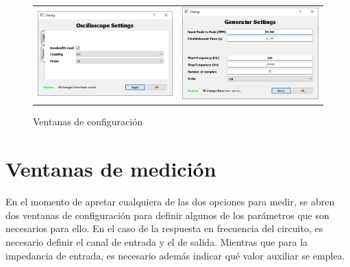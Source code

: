 \begin{figure}[H]
    \centering
    \begin{tabular}{c c}
        \includegraphics[scale=0.5]{../screenshots/oscilloscope_settings.PNG} &
        \includegraphics[scale=0.5]{../screenshots/generator_settings.PNG}
    \end{tabular}
    \caption{Ventanas de configuraci\'on}
\end{figure}

\section{Ventanas de medici\'on}
En el momento de apretar cualquiera de las dos opciones para medir, se abren dos ventanas de configuraci\'on para definir
algunos de los par\'ametros que son necesarios para ello. En el caso de la respuesta en frecuencia del circuito, es necesario definir
el canal de entrada y el de salida. Mientras que para la impedancia de entrada, es necesario adem\'as indicar qu\'e valor auxiliar se emplea.

